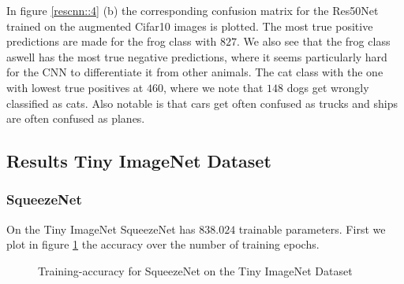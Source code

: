 \documentclass[11pt]{article}
\begin{document}
In figure \ref{rescnn::4} (b) the corresponding confusion matrix for the Res50Net trained on the augmented Cifar10 images is plotted. The most true positive predictions are made for the frog class with $827$. We also see that the frog class aswell has the most true negative predictions, where it seems particularly hard for the CNN to differentiate it from other animals. The cat class with the one with lowest true positives at $460$, where we note that $148$ dogs get wrongly classified as cats. Also notable is that cars get often confused as trucks and ships are often confused as planes.

\subsection{Results Tiny ImageNet Dataset}
\subsubsection{SqueezeNet}
On the Tiny ImageNet SqueezeNet has $838.024$ trainable parameters. First we plot in figure \ref{rescnn::5} the accuracy over the number of training epochs.

\begin{figure}
\centering
{}
  \hfill
  \hfill
\caption{Training-accuracy for SqueezeNet on the Tiny ImageNet Dataset}
\label{rescnn::5}
\end{figure}
\end{document}
